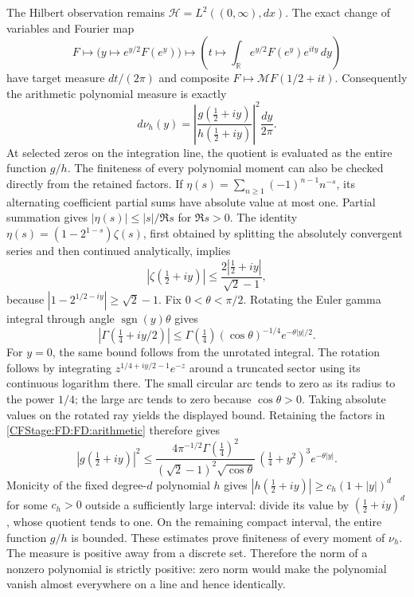 The Hilbert observation remains
\(\mathcal H=L^2((0,\infty),dx)\).  The exact change of variables and
Fourier map
\[
F\longmapsto \bigl(y\longmapsto e^{y/2}F(e^y)\bigr)
\longmapsto\left(t\longmapsto\int_{\mathbb R}e^{y/2}F(e^y)e^{ity}\,dy\right)
\]
have target measure \(dt/(2\pi)\) and composite
\(F\mapsto\mathcal MF(1/2+it)\).  Consequently the arithmetic polynomial
measure is exactly
\begin{equation}
d\nu_h(y)=\left|\frac{g(\tfrac12+iy)}{h(\tfrac12+iy)}\right|^2
\frac{dy}{2\pi}.
\tag{FD.5}\label{CFStage:FD:FD:measure}
\end{equation}
At selected zeros on the integration line, the quotient is evaluated as
the entire function \(g/h\).  The finiteness of every polynomial moment
can also be checked directly from the retained factors.  If
\(\eta(s)=\sum_{n\ge1}(-1)^{n-1}n^{-s}\), its alternating coefficient
partial sums have absolute value at most one.  Partial summation gives
\(\lvert\eta(s)\rvert\le\lvert s\rvert/\Re s\) for \(\Re s>0\).
The identity
\(\eta(s)=(1-2^{1-s})\zeta(s)\), first obtained by splitting the
absolutely convergent series and then continued analytically, implies
\[
|\zeta(\tfrac12+iy)|
\le\frac{2|\tfrac12+iy|}{\sqrt2-1},
\]
because \(|1-2^{1/2-iy}|\ge\sqrt2-1\).
Fix \(0<\theta<\pi/2\).  Rotating the Euler gamma integral through
angle \(\operatorname{sgn}(y)\theta\) gives
\[
|\Gamma(\tfrac14+iy/2)|
\le\Gamma(\tfrac14)(\cos\theta)^{-1/4}e^{-\theta|y|/2}.
\]
For \(y=0\), the same bound follows from the unrotated integral.
The rotation follows by integrating
\(z^{1/4+iy/2-1}e^{-z}\) around a truncated sector using its continuous
logarithm there.  The small circular arc tends to zero as its radius
to the power \(1/4\); the large arc tends to zero because
\(\cos\theta>0\).  Taking absolute values on the rotated ray yields
the displayed bound.  Retaining the factors in \eqref{CFStage:FD:FD:arithmetic}
therefore gives
\[
|g(\tfrac12+iy)|^2
\le
\frac{4\pi^{-1/2}\Gamma(\tfrac14)^2}
{(\sqrt2-1)^2\sqrt{\cos\theta}}\,
(\tfrac14+y^2)^3e^{-\theta|y|}.
\]
Monicity of the fixed degree-\(d\) polynomial \(h\) gives
\(|h(\tfrac12+iy)|\ge c_h(1+|y|)^d\) for some \(c_h>0\) outside
a sufficiently large interval: divide its value by
\((\tfrac12+iy)^d\), whose quotient tends to one.  On the remaining
compact interval, the entire function \(g/h\) is bounded.
These estimates prove finiteness of every moment of \(\nu_h\).
The measure is positive away from a discrete set.
Therefore the norm of a nonzero polynomial is
strictly positive: zero norm would make the polynomial vanish almost
everywhere on a line and hence identically.


